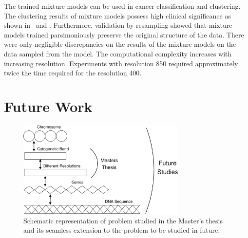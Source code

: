 The trained mixture models can be used in cancer classification and clustering. The clustering results of mixture models possess high clinical significance as shown in~\cite{Myllykangas200815} and \cite{Myllykangas20067324}. Furthermore, validation by resampling showed that mixture models trained parsimoniously preserve the original structure of the data. There were only negligible discrepancies on the results of the mixture models on the data sampled from the model. The computational complexity increases with increasing resolution. Experiments with resolution 850 required approximately twice the time required for the resolution 400.

\clearpage

\section{Future Work}
\label{s:future}

\begin{figure}[h!]
\centering
\includegraphics[width = 0.75\textwidth]{figures/problem}
\caption[Problem studied in the Master's thesis]{Schematic representation of problem studied in the Master's thesis and its seamless extension to the problem to be studied in future.} \label{Fig:problem}
\end{figure}

% 

